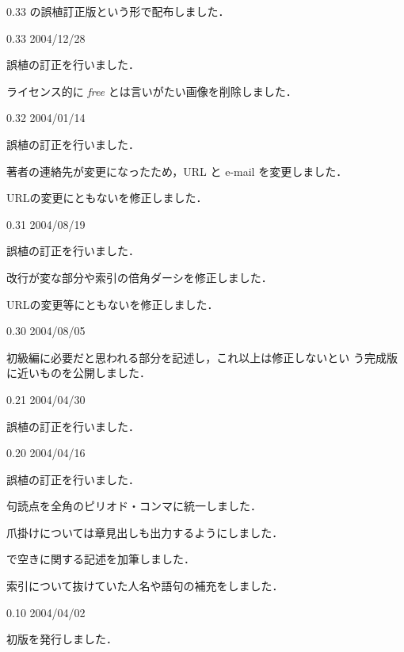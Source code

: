 \begin{changelog}
   \item 0.33 の誤植訂正版という形で配布しました．
 \item[0.33 2004/12/28] %
   \item 誤植の訂正を行いました．
   \item ライセンス的に \emph{free} とは言いがたい画像を削除しました．
 \item[0.32 2004/01/14] %
   \item 誤植の訂正を行いました．
   \item 著者の連絡先が変更になったため，URL と e-mail を変更しました．
   \item URLの変更にともないを修正しました．
 \item[0.31 2004/08/19] %
   \item 誤植の訂正を行いました．
   \item 改行が変な部分や索引の倍角ダーシを修正しました．
   \item URLの変更等にともないを修正しました．
 \item[0.30 2004/08/05] %
   \item 初級編に必要だと思われる部分を記述し，これ以上は修正しないとい
   う完成版に近いものを公開しました．
 \item[0.21 2004/04/30] %
   \item 誤植の訂正を行いました．
 \item[0.20 2004/04/16] %
   \item 誤植の訂正を行いました．
   \item 句読点を全角のピリオド・コンマに統一しました．
   \item 爪掛けについては章見出しも出力するようにしました．
   \item {}で空きに関する記述を加筆しました．
   \item 索引について抜けていた人名や語句の補充をしました．
 \item[0.10 2004/04/02] 
   \item 初版を発行しました．
\end{changelog}

